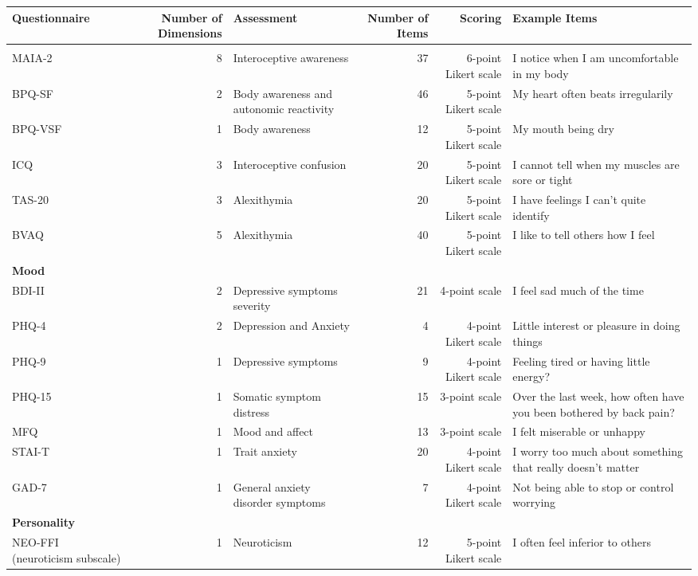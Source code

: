 \begin{table}[t]
\fontsize{6.8pt}{8.1pt}\selectfont
\begin{tabular*}{\linewidth}{@{\extracolsep{\fill}}lrlrrl}
\toprule
Questionnaire & Number of Dimensions & Assessment & Number of Items & Scoring & Example Items \\ 
\midrule\addlinespace[2.5pt]
{\bfseries Interoceptive Related} &  &  &  &  &  \\ 
MAIA-2 & 8 & Interoceptive awareness & 37 & 6-point Likert scale & I notice when I am uncomfortable in my body \\ 
BPQ-SF & 2 & Body awareness and autonomic reactivity & 46 & 5-point Likert scale & My heart often beats irregularily \\ 
BPQ-VSF & 1 & Body awareness & 12 & 5-point Likert scale & My mouth being dry \\ 
ICQ & 3 & Interoceptive confusion & 20 & 5-point Likert scale &  I cannot tell when my muscles are sore or tight \\ 
TAS-20 & 3 & Alexithymia & 20 & 5-point Likert scale & I have feelings I can't quite identify \\ 
BVAQ & 5 & Alexithymia & 40 & 5-point Likert scale & I like to tell others how I feel \\ 
{\bfseries Mood} &  &  &  &  &  \\ 
BDI-II & 2 & Depressive symptoms severity & 21 & 4-point scale & I feel sad much of the time \\ 
PHQ-4 & 2 & Depression and Anxiety & 4 & 4-point Likert scale & Little interest or pleasure in doing things \\ 
PHQ-9 & 1 & Depressive symptoms & 9 & 4-point Likert scale & Feeling tired or having little energy? \\ 
PHQ-15 & 1 & Somatic symptom distress & 15 & 3-point scale & Over the last week, how often have you been bothered by back pain? \\ 
MFQ & 1 & Mood and affect & 13 & 3-point scale & I felt miserable or unhappy \\ 
STAI-T & 1 & Trait anxiety & 20 & 4-point Likert scale & I worry too much about something that really doesn't matter \\ 
GAD-7 & 1 & General anxiety disorder symptoms & 7 & 4-point Likert scale & Not being able to stop or control worrying \\ 
{\bfseries Personality} &  &  &  &  &  \\ 
NEO-FFI (neuroticism subscale) & 1 & Neuroticism & 12 & 5-point Likert scale & I often feel inferior to others \\ 

\end{tabular*}
\end{table}
